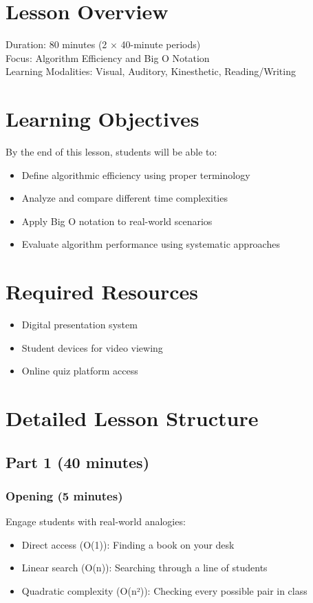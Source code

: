\documentclass[12pt]{article}
\begin{document}
\section{Lesson Overview}

\begin{tcolorbox}[colback=gray!5,colframe=bcblue,title=Lesson Framework]
Duration: 80 minutes (2 × 40-minute periods)\\
Focus: Algorithm Efficiency and Big O Notation\\
Learning Modalities: Visual, Auditory, Kinesthetic, Reading/Writing
\end{tcolorbox}

\section{Learning Objectives}
By the end of this lesson, students will be able to:
\begin{itemize}
    \item Define algorithmic efficiency using proper terminology
    \item Analyze and compare different time complexities
    \item Apply Big O notation to real-world scenarios
    \item Evaluate algorithm performance using systematic approaches
\end{itemize}

\section{Required Resources}
\begin{itemize}
    \item Digital presentation system
    \item Student devices for video viewing
    \item Online quiz platform access
\end{itemize}

\section{Detailed Lesson Structure}

\subsection{Part 1 (40 minutes)}

\subsubsection*{Opening (5 minutes)}
\begin{tcolorbox}[colback=gray!5,colframe=bcgreen]
Engage students with real-world analogies:
\begin{itemize}
    \item Direct access (O(1)): Finding a book on your desk
    \item Linear search (O(n)): Searching through a line of students
    \item Quadratic complexity (O(n²)): Checking every possible pair in class
\end{itemize}
\end{tcolorbox}
\end{document}
